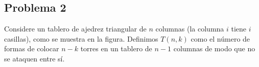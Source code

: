 \subsection*{Problema 2}
Considere un tablero de ajedrez triangular de \(n\) columnas (la columna \(i\) tiene \(i\) casillas), como se muestra en la figura. Definimos \(T(n,k)\) como el número de formas de colocar \(n-k\) torres en un tablero de \(n-1\) columnas de modo que no se ataquen entre sí.